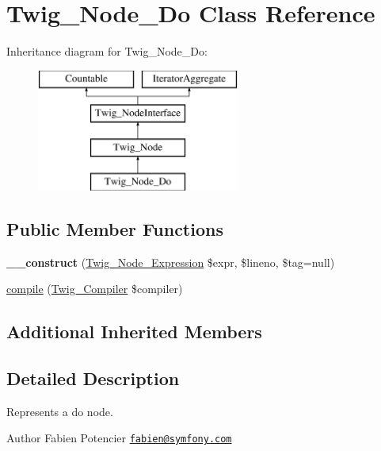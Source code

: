 \hypertarget{class_twig___node___do}{}\section{Twig\+\_\+\+Node\+\_\+\+Do Class Reference}
\label{class_twig___node___do}
Inheritance diagram for Twig\+\_\+\+Node\+\_\+\+Do\+:\begin{figure}[H]
\begin{center}
\leavevmode
\includegraphics[height=4.000000cm]{class_twig___node___do}
\end{center}
\end{figure}
\subsection*{Public Member Functions}
\begin{DoxyCompactItemize}
\item 
\hypertarget{class_twig___node___do_a3846bdad0632470525ae7d3080f6b188}{}{\bfseries \+\_\+\+\_\+construct} (\hyperlink{class_twig___node___expression}{Twig\+\_\+\+Node\+\_\+\+Expression} \$expr, \$lineno, \$tag=null)\label{class_twig___node___do_a3846bdad0632470525ae7d3080f6b188}

\item 
\hyperlink{class_twig___node___do_a4e0faa87c3fae583620b84d3607085da}{compile} (\hyperlink{class_twig___compiler}{Twig\+\_\+\+Compiler} \$compiler)
\end{DoxyCompactItemize}
\subsection*{Additional Inherited Members}


\subsection{Detailed Description}
Represents a do node.

\begin{DoxyAuthor}{Author}
Fabien Potencier \href{mailto:fabien@symfony.com}{\tt fabien@symfony.\+com} 
\end{DoxyAuthor}


